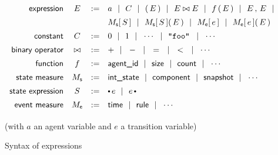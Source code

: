 \newcommand{\GEvMeasure}{M_{\textsf{e}}}
\newcommand{\GStMeasure}{M_{\textsf{s}}}


\begin{figure}[p]
  \vspace{0.5cm}
  \hrulefill
  \centering  
  \begin{equation*}\label{expr-syntax}
  \arraycolsep=5pt
  \def\arraystretch{1.4}
  \begin{array}{rccl}
    \m{expression} & E & := &
        a \OR C \OR (\,E\,) \OR E \bowtie E \OR f\,(\,E\,) \OR E\,,\, E \OR \\
     & &  &  
        \GStMeasure[\,S\,] \OR \GStMeasure[\,S\,](\,E\,) \OR
        \GEvMeasure[\,e\,] \OR \GEvMeasure[\,e\,](\,E\,)  \\
    \m{constant} & C & := & 0 \OR 1 \OR \cdots 
          \OR \STR{foo} \,\OR \cdots \\
    \m{binary operator} & \bowtie & := & + \OR - \OR = \OR < \OR \cdots \\
     \m{function} & f & := & 
        \m{agent\_id} \OR \textsf{size} \OR \textsf{count} \OR \cdots \\
    \m{state measure} & \GStMeasure & := & \m{int\_state} \OR
         \m{component} \OR \m{snapshot} \OR \cdots \\
    \m{state expression} & S & := & \StateBefore{e} \OR \StateAfter{e} \\
    \m{event measure} & \GEvMeasure & := & \m{time} \OR
         \m{rule} \OR \cdots \\
  \end{array}
  \end{equation*}

  {(with $a$ an agent variable and $e$ a transition variable)}

  \medskip
  \hrulefill
  \smallskip

  \caption{Syntax of expressions}
  \label{fig:expressions}
\end{figure}